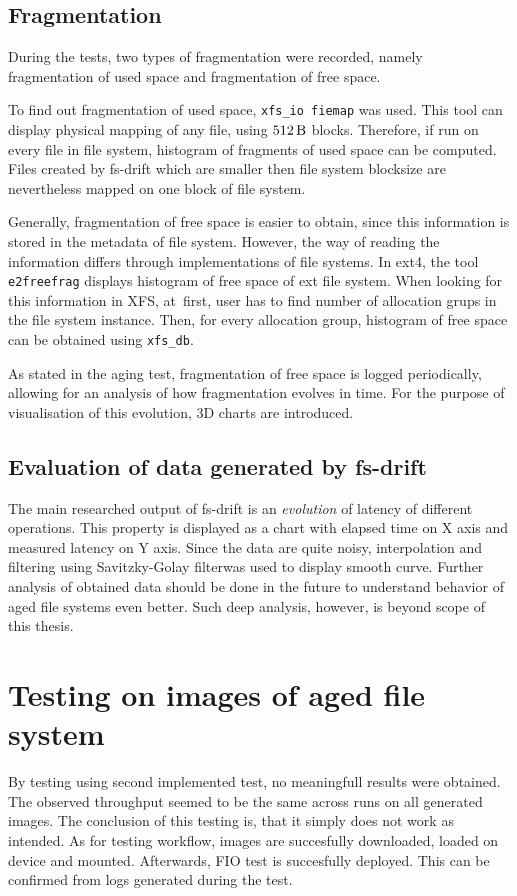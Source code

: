\documentclass[
  color, %
  table, %
  lof,   %
  lot,   %
]{fithesis3}
\begin{document}
\subsection{Fragmentation}
During the tests, two types of fragmentation were recorded, namely fragmentation of used space and fragmentation of free space.

To find out fragmentation of used space, \texttt{xfs\_io fiemap} was used. This tool can display physical mapping of any file, using $\SI{512}{\byte}$ blocks. Therefore, if run on every file in file system, histogram of fragments of used space can be computed. Files created by fs-drift which are smaller then file system blocksize are nevertheless mapped on one block of file system.

Generally, fragmentation of free space is easier to obtain, since this information is stored in the metadata of file system. However, the way of reading the information differs through implementations of file systems. In ext4, the tool \texttt{e2freefrag} displays histogram of free space of ext file system. When looking for this information in XFS, at~first, user has to find number of allocation grups in the file system instance. Then, for every allocation group, histogram of free space can be obtained using \texttt{xfs\_db}.

As stated in the aging test, fragmentation of free space is logged periodically, allowing for an analysis of how fragmentation evolves in time. For the purpose of visualisation of this evolution, 3D charts are introduced.

\subsection{Evaluation of data generated by fs-drift}
The main researched output of fs-drift is an \emph{evolution} of latency of different operations. This property is displayed as a chart with elapsed time on X axis and measured latency on Y axis. Since the data are quite noisy, interpolation and filtering using Savitzky-Golay filter\footnotemark[1] was used to display smooth curve. Further analysis of obtained data should be done in the future to understand behavior of aged file systems even better. Such deep analysis, however, is beyond scope of this thesis.

\section{Testing on images of aged file system}
\label{total_hdd}
By testing using second implemented test, no meaningfull results were obtained. The observed throughput seemed to be the same across runs on all generated images. The conclusion of this testing is, that it simply does not work as intended. As for testing workflow, images are succesfully downloaded, loaded on device and mounted. Afterwards, FIO test is succesfully deployed. This can be confirmed from logs generated during the test.
\end{document}
